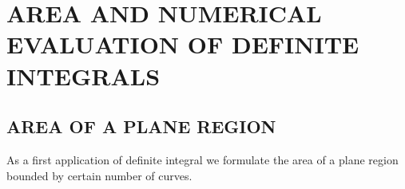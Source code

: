\documentclass[11pt]{amsbook}
\begin{document}
\renewcommand{\thesubsection}{\thesection.\alph{subsection}}

\section{AREA AND NUMERICAL EVALUATION OF DEFINITE INTEGRALS}

	\subsection{AREA OF A PLANE REGION}
		As a first application of definite integral we formulate the area of a plane region bounded by certain number of curves.
\end{document}
